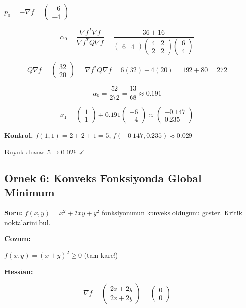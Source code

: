 \documentclass[12pt,a4paper]{article}
\theoremstyle{definition}
\theoremstyle{remark}
\begin{document}
$p_0 = -\nabla f = \begin{pmatrix} -6 \\ -4 \end{pmatrix}$

\[
\alpha_0 = \frac{\nabla f^T \nabla f}{\nabla f^T Q \nabla f} = \frac{36 + 16}{\begin{pmatrix} 6 & 4 \end{pmatrix} \begin{pmatrix} 4 & 2 \\ 2 & 2 \end{pmatrix} \begin{pmatrix} 6 \\ 4 \end{pmatrix}}
\]

\[
Q \nabla f = \begin{pmatrix} 32 \\ 20 \end{pmatrix}, \quad \nabla f^T Q \nabla f = 6(32) + 4(20) = 192 + 80 = 272
\]

\[
\alpha_0 = \frac{52}{272} = \frac{13}{68} \approx 0.191
\]

\[
x_1 = \begin{pmatrix} 1 \\ 1 \end{pmatrix} + 0.191 \begin{pmatrix} -6 \\ -4 \end{pmatrix} \approx \begin{pmatrix} -0.147 \\ 0.235 \end{pmatrix}
\]

\textbf{Kontrol:} $f(1,1) = 2 + 2 + 1 = 5$, \quad $f(-0.147, 0.235) \approx 0.029$

Buyuk dusus: $5 \rightarrow 0.029$ $\checkmark$

\subsection{Ornek 6: Konveks Fonksiyonda Global Minimum}

\textbf{Soru:} $f(x,y) = x^2 + 2xy + y^2$ fonksiyonunun konveks oldugunu goster. Kritik noktalarini bul.

\bigskip
\textbf{Cozum:}

$f(x,y) = (x + y)^2 \geq 0$ (tam kare!)

\textbf{Hessian:}

\[
\nabla f = \begin{pmatrix} 2x + 2y \\ 2x + 2y \end{pmatrix} = \begin{pmatrix} 0 \\ 0 \end{pmatrix}
\]
\end{document}
